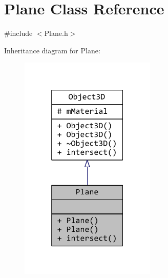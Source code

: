 \hypertarget{classPlane}{\section{Plane Class Reference}
\label{classPlane}
}


{\ttfamily \#include $<$Plane.\+h$>$}



Inheritance diagram for Plane\+:
\nopagebreak
\begin{figure}[H]
\begin{center}
\leavevmode
\includegraphics[width=184pt]{classPlane__inherit__graph}
\end{center}
\end{figure}


